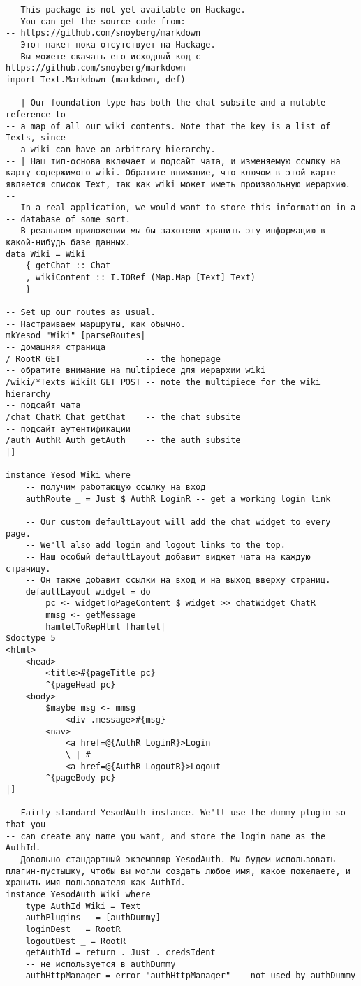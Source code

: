 \begin{lstlisting}
-- This package is not yet available on Hackage.
-- You can get the source code from:
-- https://github.com/snoyberg/markdown
-- Этот пакет пока отсутствует на Hackage.
-- Вы можете скачать его исходный код с https://github.com/snoyberg/markdown
import Text.Markdown (markdown, def)

-- | Our foundation type has both the chat subsite and a mutable reference to
-- a map of all our wiki contents. Note that the key is a list of Texts, since
-- a wiki can have an arbitrary hierarchy.
-- | Наш тип-основа включает и подсайт чата, и изменяемую ссылку на карту содержимого wiki. Обратите внимание, что ключом в этой карте является список Text, так как wiki может иметь произвольную иерархию.
--
-- In a real application, we would want to store this information in a
-- database of some sort.
-- В реальном приложении мы бы захотели хранить эту информацию в какой-нибудь базе данных.
data Wiki = Wiki
    { getChat :: Chat
    , wikiContent :: I.IORef (Map.Map [Text] Text)
    }

-- Set up our routes as usual.
-- Настраиваем маршруты, как обычно.
mkYesod "Wiki" [parseRoutes|
-- домашняя страница
/ RootR GET                 -- the homepage
-- обратите внимание на multipiece для иерархии wiki
/wiki/*Texts WikiR GET POST -- note the multipiece for the wiki hierarchy
-- подсайт чата
/chat ChatR Chat getChat    -- the chat subsite
-- подсайт аутентификации
/auth AuthR Auth getAuth    -- the auth subsite
|]

instance Yesod Wiki where
    -- получим работающую ссылку на вход
    authRoute _ = Just $ AuthR LoginR -- get a working login link

    -- Our custom defaultLayout will add the chat widget to every page.
    -- We'll also add login and logout links to the top.
    -- Наш особый defaultLayout добавит виджет чата на каждую страницу.
    -- Он также добавит ссылки на вход и на выход вверху страниц.
    defaultLayout widget = do
        pc <- widgetToPageContent $ widget >> chatWidget ChatR
        mmsg <- getMessage
        hamletToRepHtml [hamlet|
$doctype 5
<html>
    <head>
        <title>#{pageTitle pc}
        ^{pageHead pc}
    <body>
        $maybe msg <- mmsg
            <div .message>#{msg}
        <nav>
            <a href=@{AuthR LoginR}>Login
            \ | #
            <a href=@{AuthR LogoutR}>Logout
        ^{pageBody pc}
|]

-- Fairly standard YesodAuth instance. We'll use the dummy plugin so that you
-- can create any name you want, and store the login name as the AuthId.
-- Довольно стандартный экземпляр YesodAuth. Мы будем использовать плагин-пустышку, чтобы вы могли создать любое имя, какое пожелаете, и хранить имя пользователя как AuthId.
instance YesodAuth Wiki where
    type AuthId Wiki = Text
    authPlugins _ = [authDummy]
    loginDest _ = RootR
    logoutDest _ = RootR
    getAuthId = return . Just . credsIdent
    -- не используется в authDummy
    authHttpManager = error "authHttpManager" -- not used by authDummy


\end{lstlisting}
